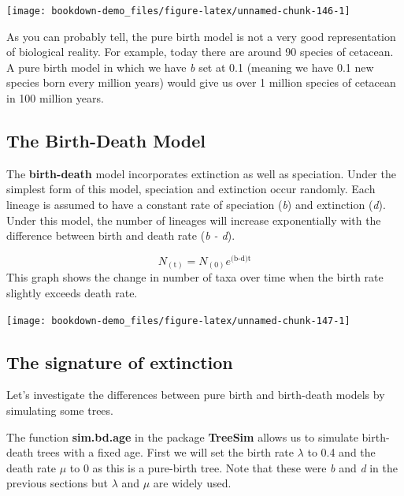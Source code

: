 \documentclass[
]{book}
\begin{document}
\begin{center}\texttt{[image: bookdown-demo\_files/figure-latex/unnamed-chunk-146-1]} \end{center}

As you can probably tell, the pure birth model is not a very good representation of biological reality. For example, today there are around 90 species of cetacean. A pure birth model in which we have \emph{b} set at 0.1 (meaning we have 0.1 new species born every million years) would give us over 1 million species of cetacean in 100 million years.

\hypertarget{the-birth-death-model}{%
\subsection{The Birth-Death Model}\label{the-birth-death-model}}

The \textbf{birth-death} model incorporates extinction as well as speciation. Under the simplest form of this model, speciation and extinction occur randomly. Each lineage is assumed to have a constant rate of speciation (\emph{b}) and extinction (\emph{d}). Under this model, the number of lineages will increase exponentially with the difference between birth and death rate (\emph{b - d}).

\[ N_{(\text{t})} = N_{(0)}e^{\text{(b-d)t}} \]
This graph shows the change in number of taxa over time when the birth rate slightly exceeds death rate.

\begin{center}\texttt{[image: bookdown-demo\_files/figure-latex/unnamed-chunk-147-1]} \end{center}

\hypertarget{the-signature-of-extinction}{%
\subsection{The signature of extinction}\label{the-signature-of-extinction}}

Let's investigate the differences between pure birth and birth-death models by simulating some trees.

The function \textbf{sim.bd.age} in the package \textbf{TreeSim} \citep{treesim} allows us to simulate birth-death trees with a fixed age. First we will set the birth rate \(\lambda\) to 0.4 and the death rate \(\mu\) to 0 as this is a pure-birth tree. Note that these were \emph{b} and \emph{d} in the previous sections but \(\lambda\) and \(\mu\) are widely used.
\end{document}
